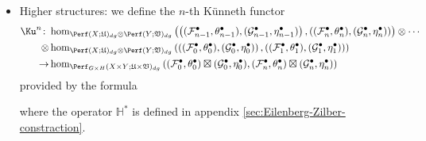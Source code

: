 \begin{defn}
\begin{itemize}
\item Higher structures:
we define the $n$-th K\"unneth functor 
\begin{align*}
\Ku^n\colon &\hom_{\Perf (X;\mathfrak{U})_{dg}\otimes\Perf(Y;\mathfrak{V})_{dg}}\left(\left(
    (\mathcal{F}_{n-1}^{\bullet},\theta_{n-1}^{\bullet}),(\mathcal{G}_{n-1}^{\bullet},\eta_{n-1}^{\bullet})\right),
    \left((\mathcal{F}_n^{\bullet},\theta_n^{\bullet}),(\mathcal{G}_{n}^{\bullet},\eta_n^{\bullet})\right)\right)
    \otimes\dotsb\\ 
    \otimes
    &\hom_{\Perf (X;\mathfrak{U})_{dg}\otimes\Perf(Y;\mathfrak{V})_{dg}}\left(\left(
    (\mathcal{F}_0^{\bullet},\theta_0^{\bullet}),(\mathcal{G}_0^{\bullet},\eta_0^{\bullet})\right),
    \left((\mathcal{F}_1^{\bullet},\theta_1^{\bullet}),(\mathcal{G}_1^{\bullet},\eta_1^{\bullet})\right)\right)\\
    \to &\hom_{\Perf_{G\times H} (X\times Y;\mathfrak{U}\times\mathfrak{V})_{dg}}
    \left((\mathcal{F}_0^{\bullet},\theta_0^{\bullet})\boxtimes (\mathcal{G}_0^{\bullet},\eta_0^{\bullet}),(\mathcal{F}_n^{\bullet},\theta_n^{\bullet})\boxtimes (\mathcal{G}_n^{\bullet},\eta_n^{\bullet})\right)
\end{align*}
provided by the formula 
\begin{center}
\end{center}
where the operator $\mathbb{H}^{\ast}$ is defined in appendix \ref{sec:Eilenberg-Zilber-constraction}.
\end{itemize}
\end{defn}
